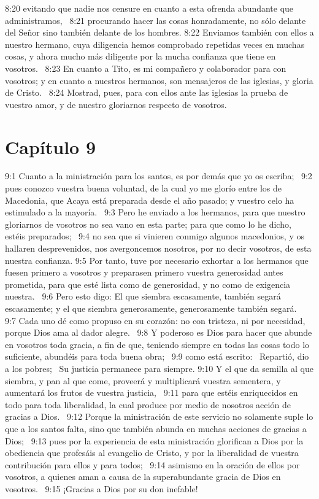8:20 evitando que nadie nos censure en cuanto a esta ofrenda abundante que administramos,  
8:21 procurando hacer las cosas honradamente, no sólo delante del Señor sino también delante de los hombres. 
8:22 Enviamos también con ellos a nuestro hermano, cuya diligencia hemos comprobado repetidas veces en muchas cosas, y ahora mucho más diligente por la mucha confianza que tiene en vosotros.  
8:23 En cuanto a Tito, es mi compañero y colaborador para con vosotros; y en cuanto a nuestros hermanos, son mensajeros de las iglesias, y gloria de Cristo.  
8:24 Mostrad, pues, para con ellos ante las iglesias la prueba de vuestro amor, y de nuestro gloriarnos respecto de vosotros.  
\section*{Capítulo 9}

9:1 Cuanto a la ministración para los santos, es por demás que yo os escriba;  
9:2 pues conozco vuestra buena voluntad, de la cual yo me glorío entre los de Macedonia, que Acaya está preparada desde el año pasado; y vuestro celo ha estimulado a la mayoría.  
9:3 Pero he enviado a los hermanos, para que nuestro gloriarnos de vosotros no sea vano en esta parte; para que como lo he dicho, estéis preparados;  
9:4 no sea que si vinieren conmigo algunos macedonios, y os hallaren desprevenidos, nos avergoncemos nosotros, por no decir vosotros, de esta nuestra confianza. 
9:5 Por tanto, tuve por necesario exhortar a los hermanos que fuesen primero a vosotros y preparasen primero vuestra generosidad antes prometida, para que esté lista como de generosidad, y no como de exigencia nuestra.  
9:6 Pero esto digo: El que siembra escasamente, también segará escasamente; y el que siembra generosamente, generosamente también segará.  
9:7 Cada uno dé como propuso en su corazón: no con tristeza, ni por necesidad, porque Dios ama al dador alegre.  
9:8 Y poderoso es Dios para hacer que abunde en vosotros toda gracia, a fin de que, teniendo siempre en todas las cosas todo lo suficiente, abundéis para toda buena obra;  
9:9 como está escrito:  
Repartió, dio a los pobres;  
Su justicia permanece para siempre. 
9:10 Y el que da semilla al que siembra, y pan al que come,  proveerá y multiplicará vuestra sementera, y aumentará los frutos de vuestra justicia,  
9:11 para que estéis enriquecidos en todo para toda liberalidad, la cual produce por medio de nosotros acción de gracias a Dios.  
9:12 Porque la ministración de este servicio no solamente suple lo que a los santos falta, sino que también abunda en muchas acciones de gracias a Dios;  
9:13 pues por la experiencia de esta ministración glorifican a Dios por la obediencia que profesáis al evangelio de Cristo, y por la liberalidad de vuestra contribución para ellos y para todos;  
9:14 asimismo en la oración de ellos por vosotros, a quienes aman a causa de la superabundante gracia de Dios en vosotros.  
9:15 ¡Gracias a Dios por su don inefable!  
